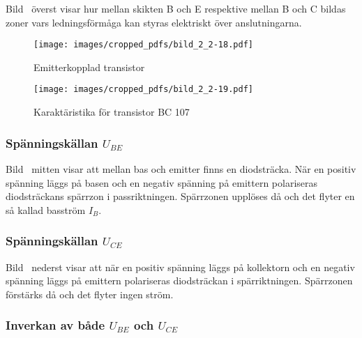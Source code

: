 
Bild~ överst visar hur mellan skikten B och E respektive
mellan B och C bildas zoner vars ledningsförmåga kan styras elektriskt över
anslutningarna.

\begin{figure*}[p]
  \begin{center}
    \texttt{[image: images/cropped\_pdfs/bild\_2\_2-18.pdf]}
    \caption{Emitterkopplad transistor}
    \label{fig:BildII2-18}
  \end{center}
\end{figure*}

\begin{figure*}[p]
  \begin{center}
    \texttt{[image: images/cropped\_pdfs/bild\_2\_2-19.pdf]}
    \caption{Karaktäristika för transistor BC 107}
    \label{fig:BildII2-19}
  \end{center}
\end{figure*}

\subsubsection{Spänningskällan \(U_{BE}\)}

Bild~ mitten visar att mellan bas och emitter finns en
diodsträcka.
När en positiv spänning läggs på basen och en negativ spänning på emittern
polariseras diodsträckans spärrzon i passriktningen.
Spärrzonen upplöses då och det flyter en så kallad basström \(I_B\).

\subsubsection{Spänningskällan \(U_{CE}\)}

Bild~ nederst visar att när en positiv spänning läggs på
kollektorn och en negativ spänning läggs på emittern polariseras diodsträckan i
spärriktningen.
Spärrzonen förstärks då och det flyter ingen ström.

\newpage
\subsubsection{Inverkan av både \(U_{BE}\) och \(U_{CE}\)}

